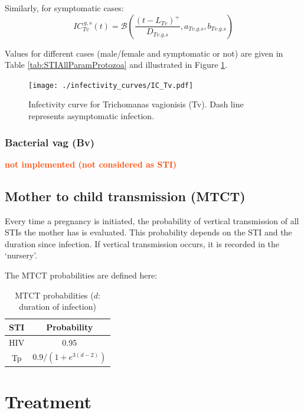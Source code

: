 \documentclass[11pt, onecolumn]{article}
\newcommand{\warning}[1]{\textbf{\textcolor{OrangeRed}{#1}}}
\begin{document}
Similarly, for symptomatic cases:
$$IC_{Tv}^{\,g,s}(t) = \mathcal{B}\left(\frac{(t-L_{Tv})^+}{D_{Tv.g.s}},a_{Tv.g.s},b_{Tv.g.s}\right)  $$

Values for different cases (male/female and symptomatic or not) are given in Table \ref{tab:STIAllParamProtozoa} and illustrated in Figure \ref{fig:ICTv}.

\begin{figure}[!ht]
\centering
   \texttt{[image: ./infectivity\_curves/IC\_Tv.pdf]}
\caption{Infectivity curve for Trichomanas vagionisis (Tv). Dash line represents asymptomatic infection.}
\label{fig:ICTv}
\end{figure}


\subsubsection{Bacterial vag (Bv)}
\warning{not implemented (not considered as STI)}

\subsection{Mother to child transmission (MTCT)}

Every time a pregnancy is initiated, the probability of vertical transmission of all STIs the mother has is evaluated. This probability depends on the STI and the duration since infection. If vertical transmission occurs, it is recorded in the `nursery'.

The MTCT probabilities are defined here:

\begin{table}[htdp]
\caption{MTCT probabilities ($d$: duration of infection)}
\begin{center}
\begin{tabular}{|c|c|}
\hline
STI & Probability \\
\hline
HIV & 0.95 \\
Tp & $0.9/\left(1+e^{3(d-2)}\right)$  \\
\hline
\end{tabular}
\end{center}
\label{default}
\end{table}%




\section{Treatment}
\end{document}
